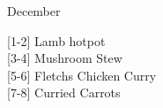 		\begin{menu}{December}
    
    \begin{recipelist}
    
        {\scriptsize[1-2]} Lamb hotpot\\
        {\scriptsize[3-4]} Mushroom Stew\\
        {\scriptsize[5-6]} Fletchs Chicken Curry\\
        {\scriptsize[7-8]} Curried Carrots\\%
    \end{recipelist}%
    \begin{recipelist}
    
    \end{recipelist}\par%
  

\end{menu}
